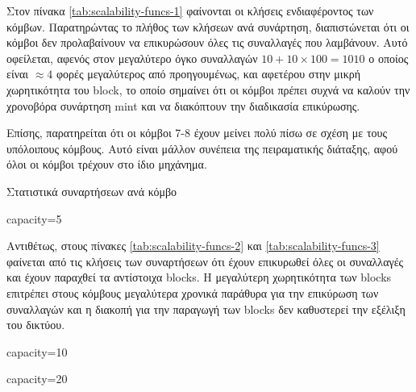 \documentclass{article}
\newcommand{\eng}[1]{\foreignlanguage{english}{#1}} %
\begin{document}
Στον πίνακα \ref{tab:scalability-funcs-1} φαίνονται οι κλήσεις ενδιαφέροντος
των κόμβων. Παρατηρώντας το πλήθος των κλήσεων ανά συνάρτηση, διαπιστώνεται ότι
οι κόμβοι δεν προλαβαίνουν να επικυρώσουν όλες τις συναλλαγές που λαμβάνουν.
Αυτό οφείλεται, αφενός στον μεγαλύτερο όγκο συναλλαγών $10 + 10 \times 100 =
1010$ ο οποίος είναι $\approx 4$ φορές μεγαλύτερος από προηγουμένως, και
αφετέρου στην μικρή χωρητικότητα του \eng{block}, το οποίο σημαίνει ότι οι
κόμβοι πρέπει συχνά να καλούν την χρονοβόρα συνάρτηση \eng{mint} και να
διακόπτουν την διαδικασία επικύρωσης.

Επίσης, παρατηρείται ότι οι κόμβοι 7-8 έχουν μείνει πολύ πίσω σε σχέση
με τους υπόλοιπους κόμβους. Αυτό είναι μάλλον συνέπεια της πειραματικής
διάταξης, αφού όλοι οι κόμβοι τρέχουν στο ίδιο μηχάνημα.

\begin{table}[ht]
    \caption{Στατιστικά συναρτήσεων ανά κόμβο}
    \label{tab:scalability-funcs}
    \begin{subtable}{\textwidth}
        \centering
        \caption{\eng{capacity=5}}
        \label{tab:scalability-funcs-1}
    \end{subtable}
\end{table}

Αντιθέτως, στους πίνακες \ref{tab:scalability-funcs-2} και \ref{tab:scalability-funcs-3}
φαίνεται από τις κλήσεις των συναρτήσεων ότι έχουν επικυρωθεί όλες οι συναλλαγές
και έχουν παραχθεί τα αντίστοιχα \eng{blocks}. Η μεγαλύτερη χωρητικότητα των
\eng{blocks} επιτρέπει στους κόμβους μεγαλύτερα χρονικά παράθυρα για την
επικύρωση των συναλλαγών και η διακοπή για την παραγωγή των \eng{blocks} δεν
καθυστερεί την εξέλιξη του δικτύου.

\begin{table}[ht]
    \ContinuedFloat
    \begin{subtable}{0.45\textwidth}
        \centering
        \caption{\eng{capacity=10}}
        \label{tab:scalability-funcs-2}
    \end{subtable}
    \hfill
    \begin{subtable}{0.45\textwidth}
        \centering
        \caption{\eng{capacity=20}}
        \label{tab:scalability-funcs-3}
    \end{subtable}
\end{table}
\FloatBarrier
\end{document}
